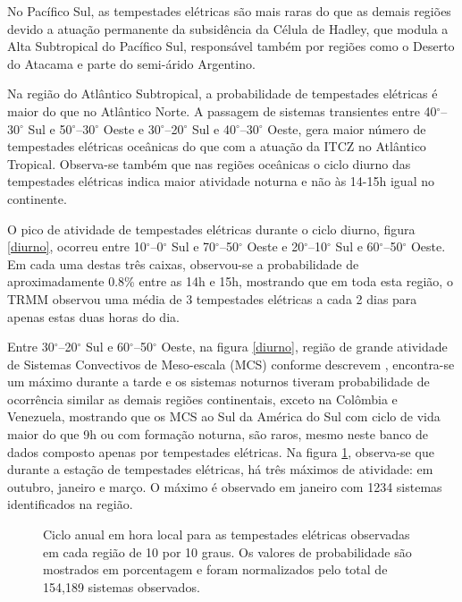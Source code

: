 No Pacífico Sul, as tempestades elétricas são mais raras do que as demais regiões devido a atuação permanente da subsidência da Célula de Hadley, que modula a Alta Subtropical do Pacífico Sul, responsável também por regiões como o Deserto do Atacama e parte do semi-árido Argentino.

Na região do Atlântico Subtropical, a probabilidade de tempestades elétricas é maior do que no Atlântico Norte. A passagem de sistemas transientes entre 40$^{\circ}$--30$^{\circ}$ Sul e 50$^{\circ}$--30$^{\circ}$ Oeste e 30$^{\circ}$--20$^{\circ}$ Sul e 40$^{\circ}$--30$^{\circ}$ Oeste, gera maior número de tempestades elétricas oceânicas do que com a atuação da ITCZ no Atlântico Tropical. Observa-se também que nas regiões oceânicas o ciclo diurno das tempestades elétricas indica maior atividade noturna e não às 14-15h igual no continente.


O pico de atividade de tempestades elétricas durante o ciclo diurno, figura \ref{diurno}, ocorreu entre 10$^{\circ}$--0$^{\circ}$ Sul e 70$^{\circ}$--50$^{\circ}$ Oeste e 20$^{\circ}$--10$^{\circ}$ Sul e 60$^{\circ}$--50$^{\circ}$ Oeste. Em cada uma destas três caixas, observou-se a probabilidade de aproximadamente 0.8\% entre as 14h e 15h, mostrando que em toda esta região, o TRMM observou uma média de 3 tempestades elétricas a cada 2 dias para apenas estas duas horas do dia.


Entre 30$^{\circ}$--20$^{\circ}$ Sul e 60$^{\circ}$--50$^{\circ}$ Oeste, na figura \ref{diurno}, região de grande atividade de Sistemas Convectivos de Meso-escala (MCS) conforme descrevem , encontra-se um máximo durante a tarde e os sistemas noturnos tiveram probabilidade de ocorrência similar as demais regiões continentais, exceto na Colômbia e Venezuela, mostrando que os MCS ao Sul da América do Sul com ciclo de vida maior do que 9h ou com formação noturna, são raros, mesmo neste banco de dados composto apenas por tempestades elétricas. Na figura \ref{anual}, observa-se que durante a estação de tempestades elétricas, há três máximos de atividade: em outubro, janeiro e março. O máximo é observado em janeiro com 1234 sistemas identificados na região.	

\begin{figure}[!ht]
\caption{Ciclo anual em hora local para as tempestades elétricas observadas em cada região de 10 por 10 graus. Os valores de probabilidade são mostrados em porcentagem e foram normalizados pelo total de 154,189 sistemas observados.}
\label{anual}
\end{figure}

